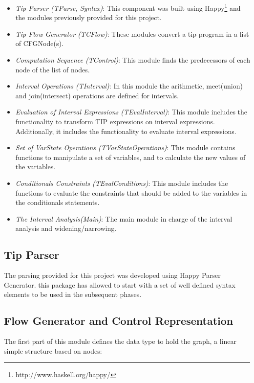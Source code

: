 \documentclass{article}
\begin{document}
\begin{itemize}
  \item \emph{Tip Parser (TParse, Syntax)}: This component was built using Happy\footnote{http://www.haskell.org/happy/} and the modules previously provided for this project.
  \item \emph{Tip Flow Generator (TCFlow)}: These modules convert a tip program in a list of CFGNode(s).
  \item \emph{Computation Sequence (TControl)}: This module finds the predecessors of each node of the list of nodes. 
  \item \emph{Interval Operations (TInterval)}: In this module the arithmetic, meet(union) and join(intersect) operations are defined for intervals. 

  \item \emph{Evaluation of Interval Expressions (TEvalInterval)}: This module includes the functionality to transform TIP expressions on interval expressions. Additionally, it includes the functionality to evaluate interval expressions.
  \item \emph{Set of VarState Operations (TVarStateOperations)}: This module contains functions to manipulate a set of variables, and to calculate the new values of the variables.
  \item \emph{Conditionals Constraints (TEvalConditions)}: This module includes the functions to evaluate the constraints that should be added to the variables in the conditionals statements.  
  \item \emph{The Interval Analysis(Main)}: The main module in charge of the interval analysis and widening/narrowing.

\end{itemize}

\subsection{Tip Parser}

The parsing provided for this project was developed using Happy Parser Generator. this package has allowed to start with a set of well defined syntax elements to be used in the subsequent phases.


\subsection{Flow Generator and Control Representation}
The first part of this module defines the data type to hold the graph, a linear simple structure based on nodes:
\end{document}
